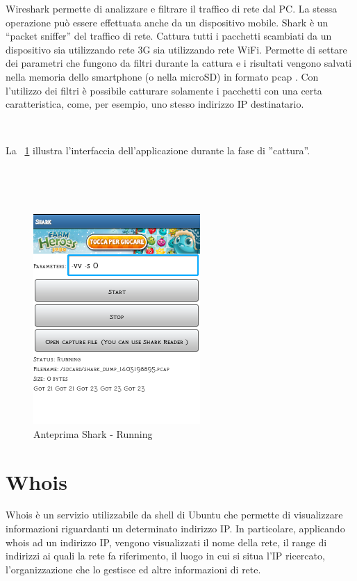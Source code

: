 \documentclass[a4paper,11pt]{book}
\begin{document}
Wireshark permette di analizzare e filtrare il traffico di rete dal PC.
La stessa operazione pu\`o essere effettuata anche da un dispositivo mobile.
Shark \cite{rif6} \`e un ``packet sniffer'' del traffico di rete. Cattura tutti i pacchetti scambiati da un dispositivo sia utilizzando rete 3G sia utilizzando rete WiFi.
Permette di settare dei parametri che fungono da filtri durante la cattura e i risultati vengono salvati nella memoria dello smartphone (o nella microSD) in formato pcap \cite{rif7}.
Con l'utilizzo dei filtri \`e possibile catturare solamente i pacchetti con una certa caratteristica, come, per esempio, uno stesso indirizzo IP destinatario.

~

La \figurename ~\ref{fig:go} illustra l'interfaccia dell'applicazione durante la fase di ''cattura''.

~


~

%
%
\begin{figure}[h!t]
\centering
\includegraphics[scale = 0.8]{shark_go}
\caption{Anteprima Shark - Running}
\label{fig:go}
\end{figure}

\clearpage

\section{Whois}
Whois \cite{rif8} \`e un servizio utilizzabile da shell di Ubuntu che permette di visualizzare informazioni riguardanti un determinato indirizzo IP.
In particolare, applicando whois ad un indirizzo IP, vengono visualizzati il nome della rete, il range di indirizzi ai quali la rete fa riferimento, il luogo in cui si situa l'IP ricercato, l'organizzazione che lo gestisce ed altre informazioni di rete.
\end{document}
